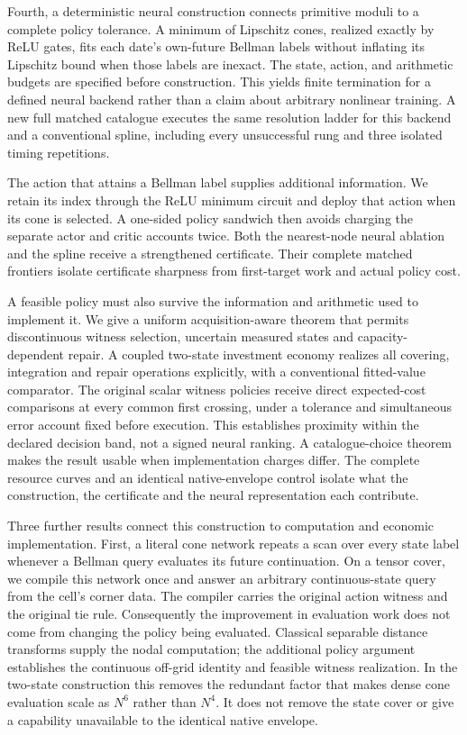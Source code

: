 \documentclass[ecta,nameyear,draft]{econsocart}
\begin{document}
Fourth, a deterministic neural construction connects primitive moduli to a complete policy tolerance. A minimum of Lipschitz cones, realized exactly by ReLU gates, fits each date's own-future Bellman labels without inflating its Lipschitz bound when those labels are inexact. The state, action, and arithmetic budgets are specified before construction. This yields finite termination for a defined neural backend rather than a claim about arbitrary nonlinear training. A new full matched catalogue executes the same resolution ladder for this backend and a conventional spline, including every unsuccessful rung and three isolated timing repetitions.

The action that attains a Bellman label supplies additional information. We retain its index through the ReLU minimum circuit and deploy that action when its cone is selected. A one-sided policy sandwich then avoids charging the separate actor and critic accounts twice. Both the nearest-node neural ablation and the spline receive a strengthened certificate. Their complete matched frontiers isolate certificate sharpness from first-target work and actual policy cost.

A feasible policy must also survive the information and arithmetic used to implement it. We give a uniform acquisition-aware theorem that permits discontinuous witness selection, uncertain measured states and capacity-dependent repair. A coupled two-state investment economy realizes all covering, integration and repair operations explicitly, with a conventional fitted-value comparator. The original scalar witness policies receive direct expected-cost comparisons at every common first crossing, under a tolerance and simultaneous error account fixed before execution. This establishes proximity within the declared decision band, not a signed neural ranking. A catalogue-choice theorem makes the result usable when implementation charges differ. The complete resource curves and an identical native-envelope control isolate what the construction, the certificate and the neural representation each contribute.

Three further results connect this construction to computation and economic implementation. First, a literal cone network repeats a scan over every state label whenever a Bellman query evaluates its future continuation. On a tensor cover, we compile this network once and answer an arbitrary continuous-state query from the cell's corner data. The compiler carries the original action witness and the original tie rule. Consequently the improvement in evaluation work does not come from changing the policy being evaluated. Classical separable distance transforms supply the nodal computation; the additional policy argument establishes the continuous off-grid identity and feasible witness realization. In the two-state construction this removes the redundant factor that makes dense cone evaluation scale as $N^6$ rather than $N^4$. It does not remove the state cover or give a capability unavailable to the identical native envelope.
\end{document}
